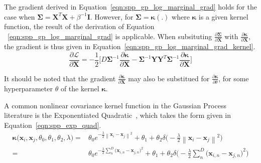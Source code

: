 The gradient derived in Equation~\ref{eqn:spp_gp_log_marginal_grad} holds 
for the case when \( \bm{\Sigma} = \bm{X}^{T}\bm{X} + \beta^{-1} \bm{I} \). 
However, for \( \bm{\Sigma} = \bm{\kappa}(.) \) where \( \bm{\kappa} \) is 
a given kernel function, the result of the derivation of Equation
~\ref{eqn:spp_gp_log_marginal_grad} is applicable. When subsituting 
\( \frac{\partial \bm{\Sigma}}{\partial \bm{X}} \) with 
\( \frac{\partial \bm{\kappa}}{\partial \bm{X}} \), the gradient is thus 
given in Equation~\ref{eqn:spp_gp_log_marginal_grad_kernel}.
\begin{equation}
  \label{eqn:spp_gp_log_marginal_grad_kernel}
  \frac{\partial \mathcal{L}}{\partial \bm{X}} = 
  -\frac{1}{2} \Bigg[
    D \bm{\Sigma}^{-1} \frac{\partial \bm{\kappa}}{\partial \bm{X}}
    - \bm{\Sigma}^{-1} \bm{YY}^{T} \bm{\Sigma}^{-1} 
    \frac{\partial \bm{\kappa}}{\partial \bm{X}}
  \Bigg]
\end{equation}

It should be noted that the gradient \( \frac{\partial \bm{\kappa}}{\partial \bm{X}} \)
may also be substitued for \( \frac{\partial \bm{\kappa}}{\partial \theta} \), for 
some hyperparameter \( \theta \) of the kernel \( \bm{\kappa} \).

A common nonlinear covariance kernel function in the Gaussian Process literature 
is the Exponentiated Quadratic~\cite{Lawrence2005}, which takes the form given in 
Equation~\ref{eqn:spp_exp_quad}.
\begin{align}
  \label{eqn:spp_exp_quad}
  \bm{\kappa} \big( \bm{x}_{i}, \bm{x}_{j}, \theta_{0}, 
  \theta_{1}, \theta_{2}, \lambda \big) ={}&
  \theta_{0} e^{-\frac{\lambda}{2} 
  \left\lVert \bm{x}_{i} - \bm{x}_{j} \right\rVert^{2}}
  + \theta_{1} + \theta_{2} \delta \big( -\frac{\lambda}{2} 
  \left\lVert \bm{x}_{i} - \bm{x}_{j} \right\rVert^{2} \big)\\
  ={}& \theta_{0} e^{-\frac{\lambda}{2} 
  \sum_{n}^{D} {\big( \bm{x}_{i, n} - \bm{x}_{j, n} \big)}^{2}}
  + \theta_{1} + \theta_{2} \delta \big( -\frac{\lambda}{2} 
  \sum_{n}^{D} {\big( \bm{x}_{i, n} - \bm{x}_{j, n} \big)}^{2} \big)
\end{align}

